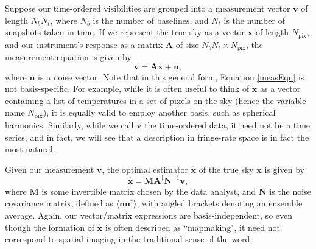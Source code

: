 \documentclass[twocolumn,apj,numberedappendix]{emulateapj}
\newcommand{\vis}{\mathbf{v}}
\newcommand{\x}{\mathbf{x}}
\newcommand{\xhat}{\hat{\mathbf{x}}}
\newcommand{\A}{\mathbf{A}}
\newcommand{\N}{\mathbf{N}}
\begin{document}
Suppose our time-ordered visibilities are grouped into a measurement vector
$\vis$ of length $N_b N_t$, where $N_b$ is the number of baselines, and $N_t$
is the number of snapshots taken in time.  If we represent the true sky as a
vector $\x$ of length $N_\textrm{pix}$, and our instrument's response as a
matrix $\A$ of size $N_b N_t \times N_\textrm{pix}$, the measurement equation
is given by
\begin{equation}
\label{measEqn}
\vis = \A \x + \mathbf{n},
\end{equation}
where $\mathbf{n}$ is a noise vector.  Note that in this general form, Equation
\eqref{measEqn} is not basis-specific.  For example, while it is often useful
to think of $\x$ as a vector containing a list of temperatures in a set of
pixels on the sky (hence the variable name $N_\textrm{pix}$), it is equally
valid to employ another basis, such as spherical harmonics.  Similarly, while
we call $\vis$ the time-ordered data, it need not be a time series, and in
fact, we will see that a description in fringe-rate space is in fact the most natural.

Given our measurement $\vis$, the optimal estimator $\xhat$ of the true sky
$\x$ is given by \citep{T97mapmaking,Morales2009,dillon_et_al2015}
\begin{equation}
\label{optEst}
\xhat = \mathbf{M} \A^\dagger \N^{-1} \vis,
\end{equation}
where $\mathbf{M}$ is some invertible matrix chosen by the data analyst, and
$\N$ is the noise covariance matrix, defined as $\langle \mathbf{n}
\mathbf{n}^\dagger \rangle$, with angled brackets denoting an ensemble average.
Again, our vector/matrix expressions are basis-independent, so even though the
formation of $\xhat$ is often described as ``mapmaking", it need not correspond
to spatial imaging in the traditional sense of the word.
\end{document}
